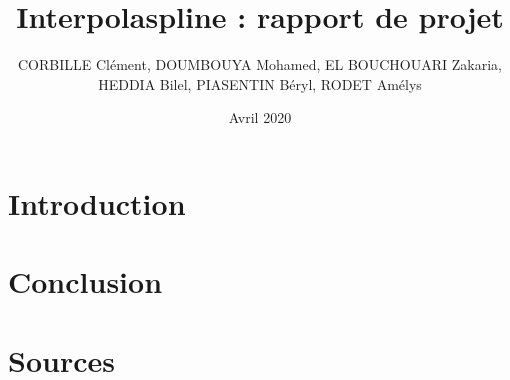 \documentclass[a4paper,12pt]{article} %
\title{Interpolaspline : rapport de projet}
\author{CORBILLE Clément, DOUMBOUYA Mohamed, EL BOUCHOUARI Zakaria, \\HEDDIA Bilel, PIASENTIN Béryl, RODET Amélys }
\date{Avril 2020}
\begin{document}
\maketitle
\tableofcontents
\section{Introduction}


\section{Conclusion}

\section{Sources}

\begin{figure}
\begin{center}
\end{center}
\end{figure}
\end{document}
